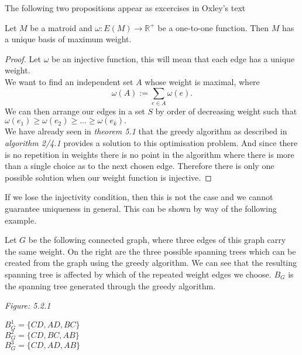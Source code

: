 \documentclass[../main.tex]{subfiles}
\begin{document}
\noindent The following two propositions appear as excercises in Oxley's text\cite{ox_book}
\begin{prop}
Let $M$ be a matroid and $\omega: E(M) \longrightarrow \mathbb{R^+}$ be a one-to-one function. Then $M$ has a unique basis of maximum weight.
\end{prop}
\begin{proof}
Let $\omega$ be an injective function, this will mean that each edge has a unique weight. \\
We want to find an independent set $A$ whose weight is maximal, where
\begin{equation}
\omega(A) := \sum_{e \in A} \omega (e).
\end{equation}
We can then arrange our edges in a set $S$ by order of decreasing weight such that $\omega(e_1) \geq \omega(e_2) \geq ... \geq \omega(e_k).$\\
We have already seen in \textit{theorem 5.1} that the greedy algorithm as described in \textit{algorithm 2/4.1} provides a solution to this optimisation problem. And since there is no repetition in weights there is no point in the algorithm where there is more than a single choice as to the next chosen edge. Therefore there is only one possible solution when our weight function is injective.
\end{proof}
\begin{rem}
If we lose the injectivity condition, then this is not the case and we cannot guarantee uniqueness in general. This can be shown by way of the following example.
\begin{exmp}
Let $G$ be the following connected graph, where three edges of this graph carry the same weight. On the right are the three possible spanning trees which can be created from the graph using the greedy algorithm. We can see that the resulting spanning tree is affected by which of the repeated weight edges we choose. $B_G$ is the spanning tree generated through the greedy algorithm.
\end{exmp}
\end{rem}
\begin{minipage}{.2\textwidth}
\textit{Figure: 5.2.1}
\end{minipage}
\hspace{3cm} \begin{minipage}{.8\textwidth}
$B_G^{1} = \{ CD,AD,BC\}$\\

$B_G^{2} = \{CD,BC,AB\}$\\

$B_G^{3} = \{CD,AD, AB\}$
\end{minipage}
\end{document}
